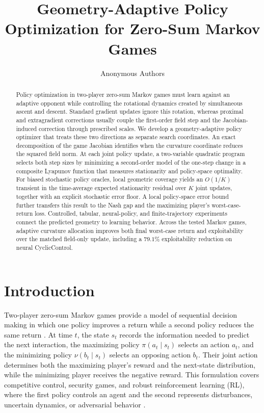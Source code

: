 \documentclass{article}
\title{Geometry-Adaptive Policy Optimization for Zero-Sum Markov Games}
\author{Anonymous Authors}
\theoremstyle{remark}
\begin{document}
\maketitle

\begin{abstract}
Policy optimization in two-player zero-sum Markov games must learn against an adaptive opponent while controlling the rotational dynamics created by simultaneous ascent and descent.
Standard gradient updates ignore this rotation, whereas proximal and extragradient corrections usually couple the first-order field step and the Jacobian-induced correction through prescribed scales.
We develop a geometry-adaptive policy optimizer that treats these two directions as separate search coordinates.
An exact decomposition of the game Jacobian identifies when the curvature coordinate reduces the squared field norm.
At each joint policy update, a two-variable quadratic program selects both step sizes by minimizing a second-order model of the one-step change in a composite Lyapunov function that measures stationarity and policy-space optimality.
For biased stochastic policy oracles, local geometric coverage yields an $O(1/K)$ transient in the time-average expected stationarity residual over $K$ joint updates, together with an explicit stochastic error floor.
A local policy-space error bound further transfers this result to the Nash gap and the maximizing player's worst-case-return loss.
Controlled, tabular, neural-policy, and finite-trajectory experiments connect the predicted geometry to learning behavior.
Across the tested Markov games, adaptive curvature allocation improves both final worst-case return and exploitability over the matched field-only update, including a $79.1\%$ exploitability reduction on neural CyclicControl.
\end{abstract}

\section{Introduction}\label{sec:intro}
Two-player zero-sum Markov games provide a model of sequential decision making in which one policy improves a return while a second policy reduces the same return \citep{Shapley1953StochasticGames,Littman1994MarkovGames}.
At time $t$, the state $s_t$ records the information needed to predict the next interaction, the maximizing policy $\pi(a_t\mid s_t)$ selects an action $a_t$, and the minimizing policy $\nu(b_t\mid s_t)$ selects an opposing action $b_t$.
Their joint action determines both the maximizing player's reward and the next-state distribution, while the minimizing player receives the negative reward.
This formulation covers competitive control, security games, and robust reinforcement learning (RL), where the first policy controls an agent and the second represents disturbances, uncertain dynamics, or adversarial behavior \citep{MorimotoDoya2005RobustRL,Iyengar2005RobustDP,NilimElGhaoui2005,Pinto2017RARL,Kamalaruban2020LangevinRARL}.
\end{document}
